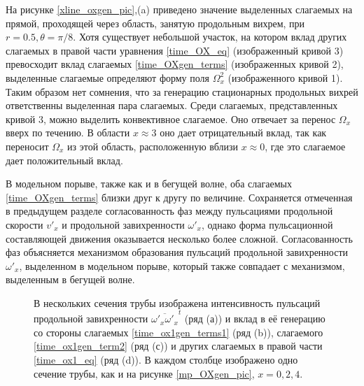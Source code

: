 На рисунке \ref{xline_oxgen_pic},(a) приведено значение выделенных слагаемых на прямой, проходящей через область, занятую продольным вихрем, при $r = 0.5, \theta = \pi/8$. Хотя существует небольшой участок, на котором вклад других слагаемых в правой части уравнения \eqref{time_OX_eq} (изображенный кривой 3) превосходит вклад слагаемых \eqref{time_OXgen_terms} (изображенных кривой 2), выделенные слагаемые определяют форму поля $\Omega_x^2$ (изображенного кривой 1). Таким образом нет сомнения, что за генерацию стационарных продольных вихрей ответственны выделенная пара слагаемых. Среди слагаемых, представленных кривой 3, можно выделить конвективное слагаемое. Оно отвечает за перенос $\Omega_x$ вверх по течению. В области $x \approx 3$ оно дает отрицательный вклад, так как переносит $\Omega_x$ из этой область, расположенную вблизи $x \approx 0$, где это слагаемое дает положительный вклад. 

В модельном порыве, также как и в бегущей волне, оба слагаемых \eqref{time_OXgen_terms} близки друг к другу по величине. Сохраняется отмеченная в предыдущем разделе согласованность фаз между пульсациями продольной скорости $v'_x$ и продольной завихренности $\omega'_x$, однако форма пульсационной составляющей движения оказывается несколько более сложной. Согласованность фаз объясняется механизмом образования пульсаций продольной завихренности $\omega'_x$, выделенном в модельном порыве, который также совпадает с механизмом, выделенным в бегущей волне. 

\begin{figure}[h]
\caption{В нескольких сечения трубы изображена интенсивность пульсаций продольной завихренности $\overline{\omega'_x \omega'_x}^t$ (ряд (а)) и вклад в её генерацию со стороны слагаемых \eqref{time_ox1gen_terms1} (ряд (b)), слагаемого \eqref{time_ox1gen_term2} (ряд (с)) и других слагаемых в правой части \eqref{time_ox1_eq} (ряд (d)). В каждом столбце изображено одно сечение трубы, как и на рисунке \ref{mp_OXgen_pic}, $x=0,2,4$.}
\label{mp_ox1gen_pic}
\end{figure}

